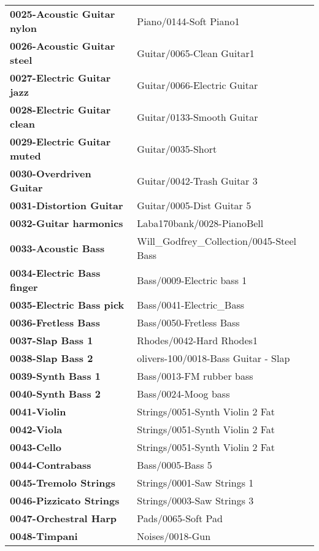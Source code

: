 \begin{longtable}{|l l|}
   \textbf{0025-Acoustic Guitar nylon} &
      Piano/0144-Soft Piano1 \\
   \textbf{0026-Acoustic Guitar steel} &
      Guitar/0065-Clean Guitar1 \\
   \textbf{0027-Electric Guitar jazz} &
      Guitar/0066-Electric Guitar \\
   \textbf{0028-Electric Guitar clean} &
      Guitar/0133-Smooth Guitar \\
   \textbf{0029-Electric Guitar muted} &
      Guitar/0035-Short \\
   \textbf{0030-Overdriven Guitar} &
      Guitar/0042-Trash Guitar 3 \\
   \textbf{0031-Distortion Guitar} &
      Guitar/0005-Dist Guitar 5 \\
   \textbf{0032-Guitar harmonics} &
      Laba170bank/0028-PianoBell \\
   \textbf{0033-Acoustic Bass} &
      Will\_Godfrey\_Collection/0045-Steel Bass \\
   \textbf{0034-Electric Bass finger} &
      Bass/0009-Electric bass 1 \\
   \textbf{0035-Electric Bass pick} &
      Bass/0041-Electric\_Bass \\
   \textbf{0036-Fretless Bass} &
      Bass/0050-Fretless Bass \\
   \textbf{0037-Slap Bass 1} &
      Rhodes/0042-Hard Rhodes1 \\
   \textbf{0038-Slap Bass 2} &
      olivers-100/0018-Bass Guitar - Slap \\
   \textbf{0039-Synth Bass 1} &
      Bass/0013-FM rubber bass \\
   \textbf{0040-Synth Bass 2} &
      Bass/0024-Moog bass \\
   \textbf{0041-Violin} &
      Strings/0051-Synth Violin 2 Fat \\
   \textbf{0042-Viola} &
      Strings/0051-Synth Violin 2 Fat \\
   \textbf{0043-Cello} &
      Strings/0051-Synth Violin 2 Fat \\
   \textbf{0044-Contrabass} &
      Bass/0005-Bass 5 \\
   \textbf{0045-Tremolo Strings} &
      Strings/0001-Saw Strings 1 \\
   \textbf{0046-Pizzicato Strings} &
      Strings/0003-Saw Strings 3 \\
   \textbf{0047-Orchestral Harp} &
      Pads/0065-Soft Pad \\
   \textbf{0048-Timpani} &
      Noises/0018-Gun \\

\end{longtable}
